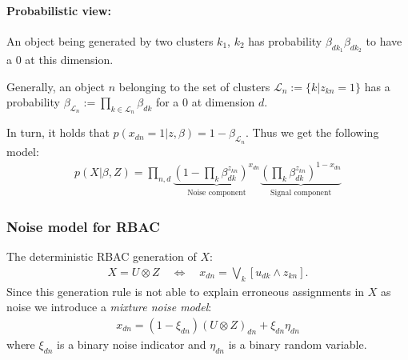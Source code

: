 \paragraph{Probabilistic view:} An object being generated by two clusters $k_1$, $k_2$ has probability $\beta_{dk_1}\beta_{dk_2}$ to have a $0$ at this dimension. 

Generally, an object $n$ belonging to the set of clusters $\mathcal L_n := \{ k|z_{kn} = 1\}$ has a probability $\beta_{\mathcal L_n} := \prod_{k\in \mathcal L_n} \beta_{dk}$ for a $0$ at dimension $d$.


In turn, it holds that $p(x_{dn}=1|z,\beta) = 1-\beta_{\mathcal L_n}$. Thus we get the following model:
\begin{align*}
    p(X|\beta, Z) = \prod_{n,d} \underbrace{\left(1-\prod_k \beta_{dk}^{z_{kn}} \right)^{x_{dn}} }_{\text{Noise component}} \underbrace{\left(\prod_k \beta_{dk}^{z_{kn}}\right)^{1-x_{dn}}}_{\text{Signal component}}
\end{align*}

\subsubsection{Noise model for RBAC}

The deterministic RBAC generation of $X$:
\begin{align*}
    X = U\otimes Z \quad \Leftrightarrow\quad  x_{dn} = \bigvee_k [u_{dk} \land z_{kn}].
\end{align*}
Since this generation rule is not able to explain erroneous assignments in $X$ as noise we introduce a \emph{mixture noise model}:
\begin{align*}
    x_{dn} = (1-\xi_{dn})(U\otimes Z)_{dn} + \xi_{dn}\eta_{dn}
\end{align*}
where $\xi_{dn}$ is a binary noise indicator and $\eta_{dn}$ is a binary random variable.

